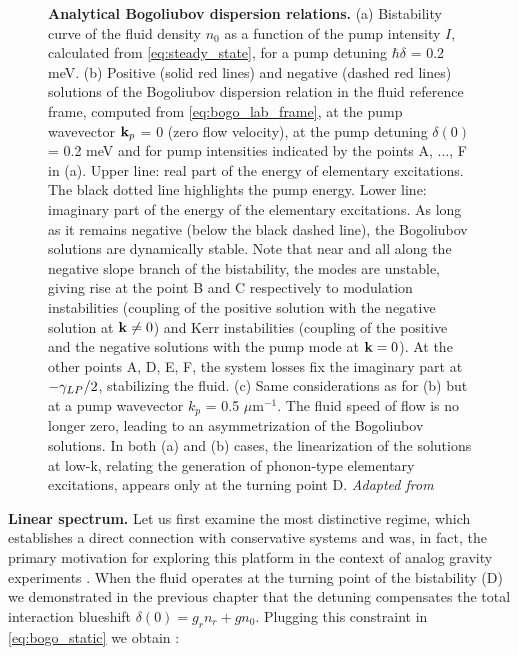\addtocounter{figure}{-1}
\begin{figure} 
    \caption{\textbf{Analytical Bogoliubov dispersion relations.} (a) Bistability curve of the fluid density $n_0$ as a function of the pump intensity $I$, calculated from \autoref{eq:steady_state}, for a pump detuning $\hbar\delta$ = 0.2 meV. (b) Positive (solid red lines) and negative (dashed red lines) solutions of the Bogoliubov dispersion relation in the fluid reference frame, computed from \autoref{eq:bogo_lab_frame}, at the pump wavevector $\mathbf{k}_p$ = 0 (zero flow velocity), at the pump detuning $\delta(0)$ = 0.2 meV and for pump intensities indicated by the points A, ..., F in (a). Upper line: real part of the energy of elementary excitations. The black dotted line highlights the pump energy. Lower line: imaginary part of the energy of the elementary excitations. As long as it remains negative (below the black dashed line), the Bogoliubov solutions are dynamically stable. Note that near and all along the negative slope branch of the bistability, the modes are unstable, giving rise at the point B and C respectively to modulation instabilities (coupling of the positive solution with the negative solution at $\mathbf{k} \neq 0$) and Kerr instabilities (coupling of the positive and the negative solutions with the pump mode at $\mathbf{k} = 0$). At the other points A, D, E, F, the system losses fix the imaginary part at $-\gamma_{LP}/2$, stabilizing the fluid. (c) Same considerations as for (b) but at a pump wavevector $k_p$ = 0.5 $\mu$m$^{-1}$. The fluid speed of flow is no longer zero, leading to an asymmetrization of the Bogoliubov solutions. In both (a) and (b) cases, the linearization of the solutions at low-k, relating the generation of phonon-type elementary excitations, appears only at the turning point D. \textit{Adapted from} \cite{claude_phd}}
    \label{analytical_bog}
\end{figure}

\bigskip 

\textbf{Linear spectrum.}
Let us first examine the most distinctive regime, which establishes a direct connection with conservative systems and was, in fact, the primary motivation for exploring this platform in the context of analog gravity experiments \cite{claude_high-resolution_2022}.
When the fluid operates at the turning point of the bistability (D) we demonstrated in the previous chapter that the detuning compensates the total interaction blueshift $\delta(0)=g_rn_r + gn_0$. 
Plugging this constraint in \autoref{eq:bogo_static} we obtain :

